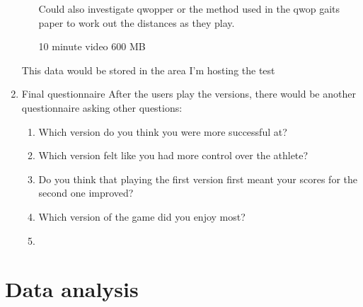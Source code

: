 \documentclass[12pt,a4paper,twoside]{article}
\begin{document}
\begin{enumerate}
\begin{enumerate}
		Could also investigate qwopper or the method used in the qwop gaits paper to work out the distances as they play.

		10 minute video 600 MB
	\end{enumerate}

	This data would be stored in the area I'm hosting the test

	\item Final questionnaire
	After the users play the versions, there would be another questionnaire asking other questions:

	\begin{enumerate}
		\item Which version do you think you were more successful at?
		\item Which version felt like you had more control over the athlete?
		\item Do you think that playing the first version first meant your scores for the second one improved?
		\item Which version of the game did you enjoy most?
		\item 
	\end{enumerate}



\end{enumerate}


\section*{Data analysis}
\end{document}
